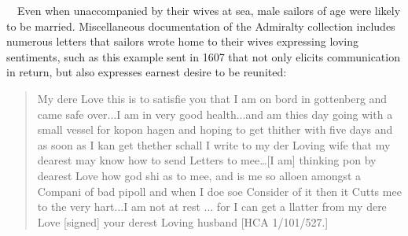 \begin{styleStandard}
\ \ Even when unaccompanied by their wives at sea, male sailors of age were likely to be married. Miscellaneous documentation of the Admiralty collection includes numerous letters that sailors wrote home to their wives expressing loving sentiments, such as this example sent in 1607 that not only elicits communication in return, but also expresses earnest desire to be reunited:
\end{styleStandard}


\begin{quotation}
My dere Love this is to satisfie you that I am on bord in gottenberg and came safe over...I am in very good health...and am thies day going with a small vessel for kopon hagen and hoping to get thither with five days and as soon as I kan get thether schall I write to my der Loving wife that my dearest may know how to send Letters to mee…[I am] thinking pon by dearest Love how god shi as to mee, and is me so alloen amongst a Compani of bad pipoll and when I doe soe Consider of it then it Cutts mee to the very hart...I am not at rest ... for I can get a llatter from my dere Love [signed] your derest Loving husband [HCA 1/101/527.]

\end{quotation}
